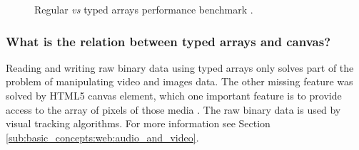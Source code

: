 \begin{figure}[!htb]
  \caption{Regular \textit{vs} typed arrays performance benchmark \cite{TypedArrayPerformance2013}.}
  \label{figure:typed_arrays_performance}
\end{figure}


\subsubsection{What is the relation between typed arrays and canvas?} %
\label{subsub:basic_concepts:web:javascript_typed_arrays:relation_between_typed_and_canvas}

Reading and writing raw binary data using typed arrays only solves part of the problem of manipulating video and images data. The other missing feature was solved by HTML5 canvas element, which one important feature is to provide access to the array of pixels of those media \cite{Canvas2013,Hickson2013}. The raw binary data is used by visual tracking algorithms. For more information see Section \ref{sub:basic_concepts:web:audio_and_video}.

